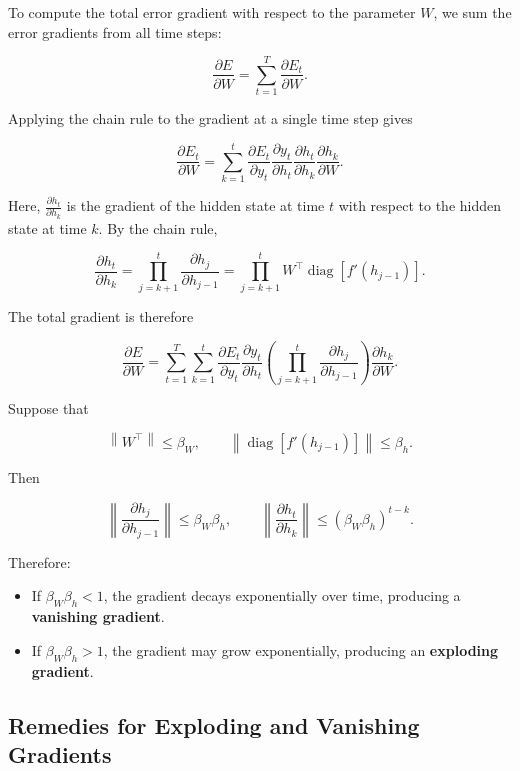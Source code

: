 \documentclass[
  a4paper,
  10pt]{article}
\providecommand{\tightlist}{%
  \setlength{\itemsep}{0pt}\setlength{\parskip}{0pt}}
\begin{document}
To compute the total error gradient with respect to the parameter \(W\),
we sum the error gradients from all time steps:

\[
\frac{\partial E}{\partial W}
=\sum_{t=1}^{T}\frac{\partial E_t}{\partial W}.
\]

Applying the chain rule to the gradient at a single time step gives

\[
\frac{\partial E_t}{\partial W}
=\sum_{k=1}^{t}
\frac{\partial E_t}{\partial y_t}
\frac{\partial y_t}{\partial h_t}
\frac{\partial h_t}{\partial h_k}
\frac{\partial h_k}{\partial W}.
\]

Here, \(\frac{\partial h_t}{\partial h_k}\) is the gradient of the
hidden state at time \(t\) with respect to the hidden state at time
\(k\). By the chain rule,

\[
\frac{\partial h_t}{\partial h_k}
=\prod_{j=k+1}^{t}\frac{\partial h_j}{\partial h_{j-1}}
=\prod_{j=k+1}^{t}W^\top
\operatorname{diag}\left[f'(h_{j-1})\right].
\]

The total gradient is therefore

\[
\frac{\partial E}{\partial W}
=\sum_{t=1}^{T}\sum_{k=1}^{t}
\frac{\partial E_t}{\partial y_t}
\frac{\partial y_t}{\partial h_t}
\left(
\prod_{j=k+1}^{t}\frac{\partial h_j}{\partial h_{j-1}}
\right)
\frac{\partial h_k}{\partial W}.
\]

Suppose that

\[
\left\lVert W^\top\right\rVert\le\beta_W,
\qquad
\left\lVert\operatorname{diag}\left[f'(h_{j-1})\right]\right\rVert
\le\beta_h.
\]

Then

\[
\left\lVert\frac{\partial h_j}{\partial h_{j-1}}\right\rVert
\le\beta_W\beta_h,
\qquad
\left\lVert\frac{\partial h_t}{\partial h_k}\right\rVert
\le(\beta_W\beta_h)^{t-k}.
\]

Therefore:

\begin{itemize}
\tightlist
\item
  If \(\beta_W\beta_h<1\), the gradient decays exponentially over time,
  producing a \textbf{vanishing gradient}.
\item
  If \(\beta_W\beta_h>1\), the gradient may grow exponentially,
  producing an \textbf{exploding gradient}.
\end{itemize}

\subsection{Remedies for Exploding and Vanishing
Gradients}\label{remedies-for-exploding-and-vanishing-gradients}
\end{document}
